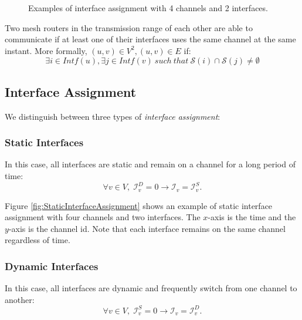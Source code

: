 \documentclass[twoside]{article}
\newcommand{\intf}{\mathcal{I}}
\newcommand{\sched}{\mathcal{S}}
\begin{document}
\begin{figure}[t!]
\centering
 	\caption{Examples of interface assignment with 4 channels and 2 interfaces.}
	\label{fig:interface-assignment}
\end{figure}



Two mesh routers in the transmission range of each other are able to communicate if at least one of their interfaces uses the same channel at the same instant.
More formally, $(u,v) \in V^2, (u,v) \in E$ if:
\begin{equation}
	\exists i \in Intf(u), \exists j \in Intf(v) \ such\ that\ 
	\sched(i) \cap \sched(j) \neq \emptyset
\end{equation}





\subsection{Interface Assignment}
\label{section:InterfaceAssignment}




We distinguish between three types of \textit{interface assignment}:

\subsubsection{Static Interfaces}

In this case, all interfaces are static and remain on a channel for a long period of time:
\begin{equation}
 \forall v\in V, \; \intf_{v}^D=0\rightarrow \intf_{v}= \intf_{v}^S.
\end{equation}

Figure \ref{fig:StaticInterfaceAssignment} shows an example of static interface assignment with four channels and two interfaces.
The $x$-axis is the time and the $y$-axis is the channel id.
Note that each interface remains on the same channel regardless of time.


\subsubsection{Dynamic Interfaces} 
In this case, all interfaces are dynamic and frequently switch from one channel to another:
\begin{equation}
 \forall v\in V, \; \intf_{v}^S=0\rightarrow \intf_{v}= \intf_{v}^D.
\end{equation}
\end{document}
